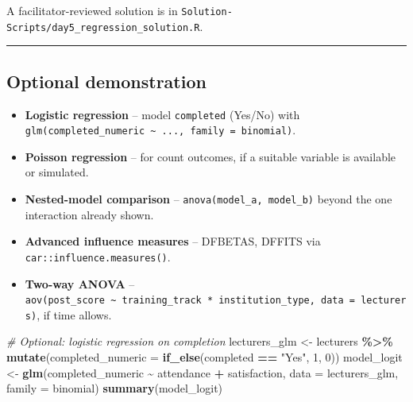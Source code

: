 \documentclass[11pt]{article}
\newenvironment{Shaded}{\begin{snugshade}}{\end{snugshade}}
\newcommand{\AttributeTok}[1]{\textcolor[rgb]{0.13,0.29,0.53}{#1}}
\newcommand{\CommentTok}[1]{\textcolor[rgb]{0.56,0.35,0.01}{\textit{#1}}}
\newcommand{\DecValTok}[1]{\textcolor[rgb]{0.00,0.00,0.81}{#1}}
\newcommand{\FunctionTok}[1]{\textcolor[rgb]{0.13,0.29,0.53}{\textbf{#1}}}
\newcommand{\NormalTok}[1]{#1}
\newcommand{\OtherTok}[1]{\textcolor[rgb]{0.56,0.35,0.01}{#1}}
\newcommand{\SpecialCharTok}[1]{\textcolor[rgb]{0.81,0.36,0.00}{\textbf{#1}}}
\newcommand{\StringTok}[1]{\textcolor[rgb]{0.31,0.60,0.02}{#1}}
\providecommand{\tightlist}{%
  \setlength{\itemsep}{0pt}\setlength{\parskip}{0pt}}
\begin{document}
A facilitator-reviewed solution is in
\texttt{Solution-Scripts/day5\_regression\_solution.R}.

\begin{center}\rule{0.5\linewidth}{0.5pt}\end{center}

\hypertarget{optional-demonstration}{%
\subsection{Optional demonstration}\label{optional-demonstration}}

\begin{itemize}
\tightlist
\item
  \textbf{Logistic regression} -- model \texttt{completed} (Yes/No) with
  \texttt{glm(completed\_numeric\ \textasciitilde{}\ ...,\ family\ =\ binomial)}.
\item
  \textbf{Poisson regression} -- for count outcomes, if a suitable
  variable is available or simulated.
\item
  \textbf{Nested-model comparison} --
  \texttt{anova(model\_a,\ model\_b)} beyond the one interaction already
  shown.
\item
  \textbf{Advanced influence measures} -- DFBETAS, DFFITS via
  \texttt{car::influence.measures()}.
\item
  \textbf{Two-way ANOVA} --
  \texttt{aov(post\_score\ \textasciitilde{}\ training\_track\ *\ institution\_type,\ data\ =\ lecturers)},
  if time allows.
\end{itemize}

\begin{Shaded}
\begin{Highlighting}[]
\CommentTok{\# Optional: logistic regression on completion}
\NormalTok{lecturers\_glm }\OtherTok{\textless{}{-}}\NormalTok{ lecturers }\SpecialCharTok{\%\textgreater{}\%} \FunctionTok{mutate}\NormalTok{(}\AttributeTok{completed\_numeric =} \FunctionTok{if\_else}\NormalTok{(completed }\SpecialCharTok{==} \StringTok{"Yes"}\NormalTok{, }\DecValTok{1}\NormalTok{, }\DecValTok{0}\NormalTok{))}
\NormalTok{model\_logit }\OtherTok{\textless{}{-}} \FunctionTok{glm}\NormalTok{(completed\_numeric }\SpecialCharTok{\textasciitilde{}}\NormalTok{ attendance }\SpecialCharTok{+}\NormalTok{ satisfaction, }\AttributeTok{data =}\NormalTok{ lecturers\_glm, }\AttributeTok{family =}\NormalTok{ binomial)}
\FunctionTok{summary}\NormalTok{(model\_logit)}
\end{Highlighting}
\end{Shaded}
\end{document}
